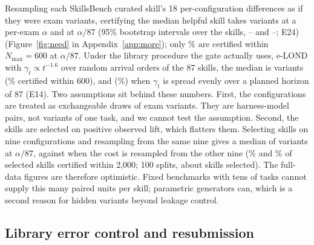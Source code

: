 Resampling each SkillsBench curated skill's 18 per-configuration differences as if they were exam variants, certifying the median helpful skill takes \NSbMedNAlpha{} variants at a per-exam $\alpha$ and \NSbMedNBonf{} at $\alpha/87$ (95\% bootstrap intervals over the skills, \NSbMedNAlphaLo--\NSbMedNAlphaHi{} and \NSbMedNBonfLo--\NSbMedNBonfHi; E24) (Figure~\ref{fig:need} in Appendix~\ref{app:more}); only \NSbCertSix\% are certified within $N_{\max}=600$ at $\alpha/87$. Under the library procedure the gate actually uses, e-LOND with $\gamma_t\propto t^{-1.6}$ over random arrival orders of the 87 skills, the median is \NRvLibELond{} variants (\NRvLibELondCert\% certified within 600), and \NRvLibHorizon{} (\NRvLibHorizonCert\%) when $\gamma_t$ is spread evenly over a planned horizon of 87 (E14). Two assumptions sit behind these numbers. First, the configurations are treated as exchangeable draws of exam variants. They are harness-model pairs, not variants of one task, and we cannot test the assumption. Second, the skills are selected on positive observed lift, which flatters them. Selecting skills on nine configurations and resampling from the same nine gives a median of \NRvSelSame{} variants at $\alpha/87$, against \NRvSelHeld{} when the cost is resampled from the other nine (\NRvSelSameFin\% and \NRvSelHeldFin\% of selected skills certified within 2{,}000; 100 splits, about \NRvSelN{} skills selected). The full-data figures are therefore optimistic. Fixed benchmarks with tens of tasks cannot supply this many paired units per skill; parametric generators can, which is a second reason for hidden variants beyond leakage control.

\subsection{Library error control and resubmission}
\label{sec:res-library}

